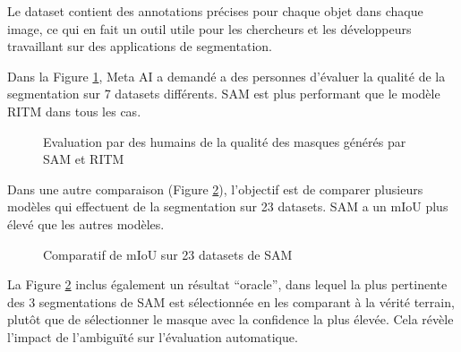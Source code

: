 Le dataset contient des annotations précises pour chaque objet dans chaque image, ce qui en fait un outil utile pour les chercheurs et les développeurs travaillant sur des applications de segmentation.

Dans la Figure \ref{fig:ch2_sam2_08_eval_sam_humain}, Meta AI a demandé a des personnes d’évaluer la qualité de la segmentation sur 7 datasets différents. SAM est plus performant que le modèle RITM \cite{sofiiuk_reviving_2021} dans tous les cas.

\begin{figure}[H]
    \centering
    \caption{Evaluation par des humains de la qualité des masques générés par SAM et RITM  \cite{kirillov_segment_2023}}
    \label{fig:ch2_sam2_08_eval_sam_humain}
\end{figure}

Dans une autre comparaison (Figure \ref{fig:ch2_sam2_09_eval_sam_miou}), l'objectif est de comparer plusieurs modèles qui effectuent de la segmentation sur 23 datasets. SAM a un mIoU plus élevé que les autres modèles.

\begin{figure}[H]
    \centering
    \caption{Comparatif de mIoU sur 23 datasets de SAM \cite{kirillov_segment_2023}}
    \label{fig:ch2_sam2_09_eval_sam_miou}
\end{figure}

La Figure \ref{fig:ch2_sam2_09_eval_sam_miou} inclus également un résultat ``oracle'', dans lequel la plus pertinente des 3 segmentations de SAM est sélectionnée en les comparant à la vérité terrain, plutôt que de sélectionner le masque avec la confidence la plus élevée. Cela révèle l'impact de l'ambiguïté sur l'évaluation automatique.

